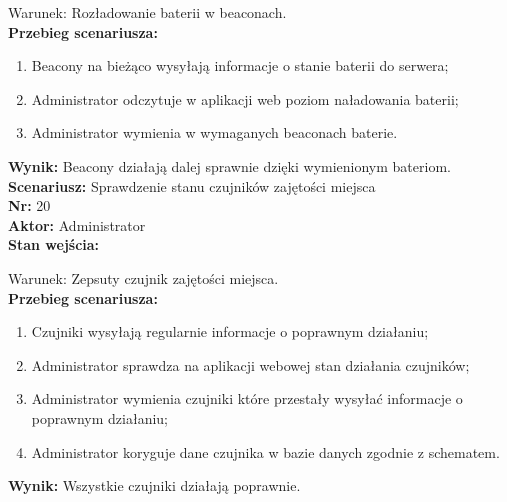 \documentclass[12pt,a4paper]{article}
\begin{document}
Warunek: Rozładowanie baterii w beaconach.
\\{\bf Przebieg scenariusza:}
\begin{enumerate}
\item Beacony na bieżąco wysyłają informacje o stanie baterii do serwera;
\item Administrator odczytuje w aplikacji web poziom naładowania baterii;
\item Administrator wymienia w wymaganych beaconach baterie.
\end{enumerate}
{\bf Wynik:} Beacony działają dalej sprawnie dzięki wymienionym bateriom.
\newline\newline\newline\newline\newline
{\large \bf Scenariusz:} Sprawdzenie stanu czujników zajętości miejsca
\\{\bf Nr:} 20
\\{\bf Aktor:} Administrator
\\{\bf Stan wejścia:}

Warunek: Zepsuty czujnik zajętości miejsca.
\\{\bf Przebieg scenariusza:}
\begin{enumerate}
\item Czujniki wysyłają regularnie informacje o poprawnym działaniu;
\item Administrator sprawdza na aplikacji webowej stan działania czujników;
\item Administrator wymienia czujniki które przestały wysyłać informacje o poprawnym działaniu;
\item Administrator koryguje dane czujnika w bazie danych zgodnie z schematem.
\end{enumerate}
{\bf Wynik:} Wszystkie czujniki działają poprawnie.



\newpage
\end{document}
